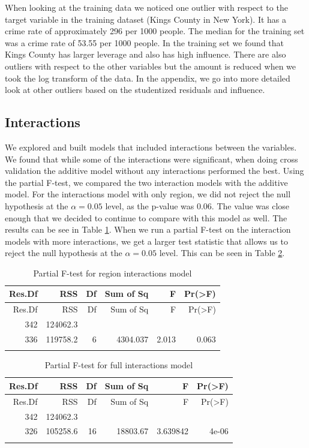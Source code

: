 \documentclass[]{article}
\begin{document}
When looking at the training data we noticed one outlier with respect to
the target variable in the training dataset (Kings County in New York).
It has a crime rate of approximately 296 per 1000 people. The median for
the training set was a crime rate of 53.55 per 1000 people. In the
training set we found that Kings County has larger leverage and also has
high influence. There are also outliers with respect to the other
variables but the amount is reduced when we took the log transform of
the data. In the appendix, we go into more detailed look at other
outliers based on the studentized residuals and influence.

\subsection{Interactions}\label{interactions}

We explored and built models that included interactions between the
variables. We found that while some of the interactions were
significant, when doing cross validation the additive model without any
interactions performed the best. Using the partial F-test, we compared
the two interaction models with the additive model. For the interactions
model with only region, we did not reject the null hypothesis at the
\(\alpha = 0.05\) level, as the p-value was 0.06. The value was close
enough that we decided to continue to compare with this model as well.
The results can be see in Table \ref{table:ftest_region_inter}. When we run a partial F-test
on the interaction models with more interactions, we get a larger test
statistic that allows us to reject the null hypothesis at the
\(\alpha = 0.05\) level. This can be seen in Table \ref{table:ftest_full_inter}.

\begin{longtable}[]{@{}rrrrrr@{}}
\caption{Partial F-test for region interactions model}\tabularnewline
\toprule
Res.Df & RSS & Df & Sum of Sq & F & Pr(\textgreater{}F)\tabularnewline
\midrule
\endfirsthead
\toprule
Res.Df & RSS & Df & Sum of Sq & F & Pr(\textgreater{}F)\tabularnewline
\midrule
\endhead
342 & 124062.3 &  &  &  & \tabularnewline
336 & 119758.2 & 6 & 4304.037 & 2.013 & 0.063\tabularnewline
\bottomrule
\label{table:ftest_region_inter}
\end{longtable}

\begin{longtable}[]{@{}rrrrrr@{}}
\caption{Partial F-test for full interactions model}\tabularnewline
\toprule
Res.Df & RSS & Df & Sum of Sq & F & Pr(\textgreater{}F)\tabularnewline
\midrule
\endfirsthead
\toprule
Res.Df & RSS & Df & Sum of Sq & F & Pr(\textgreater{}F)\tabularnewline
\midrule
\endhead
342 & 124062.3 &  &  &  & \tabularnewline
326 & 105258.6 & 16 & 18803.67 & 3.639842 & 4e-06\tabularnewline
\bottomrule
\label{table:ftest_full_inter}
\end{longtable}
\end{document}
